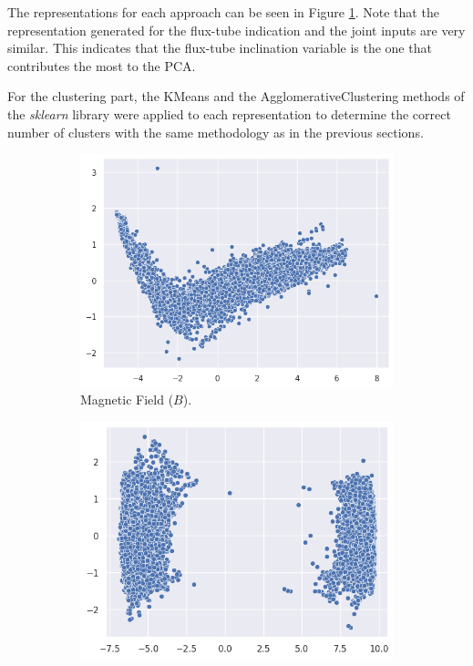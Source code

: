 The representations for each approach can be seen in Figure \ref{fig:pca_mag_2d}. Note that the representation generated for the flux-tube indication and the joint inputs are very similar. This indicates that the flux-tube inclination variable is the one that contributes the most to the PCA.

For the clustering part, the KMeans and the AgglomerativeClustering methods of the \textit{sklearn} library were applied to each representation to determine the correct number of clusters with the same methodology as in the previous sections. 

\begin{figure}[]
    \caption[PCA applied to the different variables]{PCA applied to the different variables. (a) and (b) represent the PCAs of the magnetic field variable ($B[G]$) and the flux-tube inclination variable ($\alpha [deg]$), respectively; (c) is the PCA of all input variables combined.}
    \label{fig:pca_latent_repr}
    \begin{subfigure}[h]{0.329\textwidth}
        \centering
        \includegraphics[width=\textwidth]{figures/mag_pca_2d.png}
        \caption{Magnetic Field ($B$).}
        \label{fig:pca_mag_2d}
    \end{subfigure}
    \hfill
    \begin{subfigure}[h]{0.329\textwidth}
        \centering
        \includegraphics[width=\textwidth]{figures/alpha_pca_2d.png}

\end{subfigure}
\end{figure}
